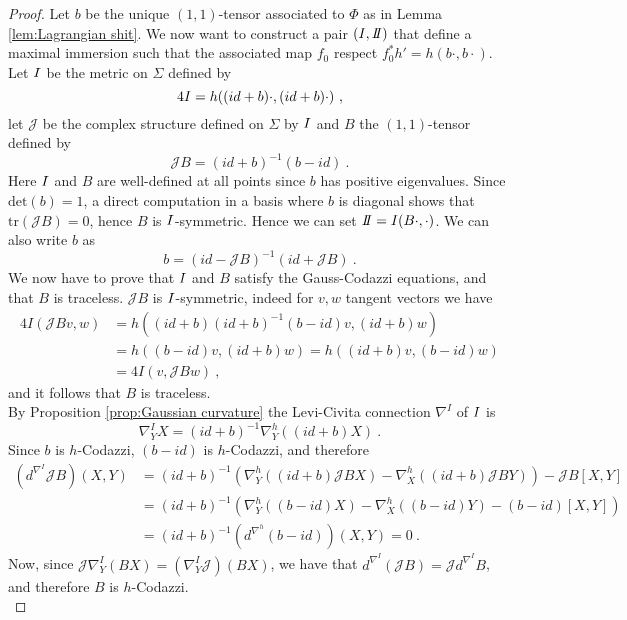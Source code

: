 \begin{proof}
    Let $b$ be the unique $(1,1)$-tensor associated to $\Phi$ as in Lemma \ref{lem:Lagrangian shit}. We now want to construct a pair $(\I,\II)$ that define a maximal immersion such that the associated map $f_0$ respect $f_0^* h' = h(b \cdot, b \cdot)$.\\
    Let $I$ be the metric on $\Sigma$ defined by
    \[
        4 I = h((id + b)\cdot , (id + b)\cdot ) \ ,
    \]
    let $\mathcal{J}$ be the complex structure defined on $\Sigma$ by $I$ and $B$ the $(1,1)$-tensor defined by
    \[
        \mathcal{J} B = (id + b)^{-1} (b-id) \ .
    \]
    Here $I$ and $B$ are well-defined at all points since $b$ has positive eigenvalues. Since $\text{det}(b)=1$, a direct computation in a basis where $b$ is diagonal shows that $\text{tr}(\mathcal{J} B) = 0 $, hence $B$ is $I$-symmetric. Hence we can set $\II = \I (B \cdot, \cdot)$. We can also write $b$ as
    \[
        b = (id - \mathcal{J}B)^{-1} (id+\mathcal{J}B) \ .
    \]  
    We now have to prove that $I$ and $B$ satisfy the Gauss-Codazzi equations, and that $B$ is traceless.
    $\mathcal{J} B$ is $I$-symmetric, indeed for $v,w$ tangent vectors we have
    \[
    \begin{split}
        4I(\mathcal{J}B v,w) & = h((id + b) (id + b)^{-1} (b-id) v , (id + b)w) \\
        & = h((b-id) v , (id + b)w) = h((id + b) v , (b-id)w) \\
        & = 4 I (v, \mathcal{J}B w) \ ,
    \end{split}
    \]
    and it follows that $B$ is traceless.\\
    By Proposition \ref{prop:Gaussian curvature} the Levi-Civita connection $\nabla^I$ of $I$ is
    \[
        \nabla^I_Y X = (id + b)^{-1} \nabla^h_Y ((id+b)X) \ .
    \]
    Since $b$ is $h$-Codazzi, $(b-id)$ is $h$-Codazzi, and therefore
    \[
    \begin{split}
        (d^{\nabla^I} \mathcal{J}B)(X,Y) & = (id + b)^{-1} (\nabla^h_Y ((id+b)\mathcal{J}B X) - \nabla^h_X ((id+b)\mathcal{J}B Y) ) - \mathcal{J}B \left[ X,Y \right] \\
        & = (id + b)^{-1} (\nabla^h_Y ((b-id) X) -  \nabla^h_X ((b-id) Y) - (b-id) \left[ X,Y \right] ) \\
        & = (id + b)^{-1}(d^{\nabla^h}(b-id))(X,Y) = 0 \ .
    \end{split}
    \]
    Now, since $\mathcal{J}\nabla^I_Y(BX) = (\nabla^I_Y \mathcal{J})(BX)$, we have that $d^{\nabla^I} (\mathcal{J}B) = \mathcal{J} d^{\nabla^I} B$, and therefore $B$ is $h$-Codazzi.\\

\end{proof}
